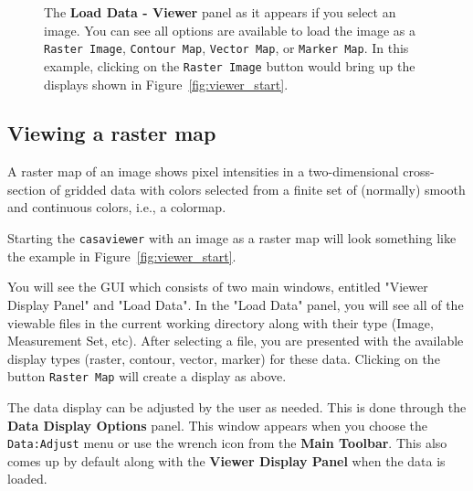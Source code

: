 \begin{figure}[h!]
\begin{center}
\caption{\label{fig:viewer_load_image} The {\bf Load Data - Viewer} panel
as it appears if you select an image.  You can see all options
are available to load the image as a {\tt Raster Image}, 
{\tt Contour Map}, {\tt Vector Map}, or {\tt Marker Map}.
In this example, clicking on the {\tt Raster Image} button would 
bring up the displays shown in Figure~\ref{fig:viewer_start}.}
\hrulefill
\end{center}
\end{figure}


\subsection{Viewing a raster map}
\label{section:display.image.raster}

A raster map of an image shows pixel intensities in a two-dimensional
cross-section of gridded data with colors selected from a finite set
of (normally) smooth and continuous colors, i.e., a colormap.


Starting the {\tt casaviewer} with an image as a raster map will look
something like the example in Figure~\ref{fig:viewer_start}. 
 
You will see the GUI which consists of two main windows, entitled
"Viewer Display Panel" and "Load Data". In the "Load Data" panel, you
will see all of the viewable files in the current working directory along
with their type (Image, Measurement Set, etc).  After selecting a file, you
are presented with the available display types (raster, contour,
vector, marker) for these data. Clicking
on the button {\tt Raster Map} will create a display as above. 

The data display can be adjusted by the user as needed.  This
is done through the {\bf Data Display Options} panel.  This window
appears when you choose the {\tt Data:Adjust} menu or use the
wrench icon from the {\bf Main Toolbar}.  This also comes up
by default along with the {\bf Viewer Display Panel} when the
data is loaded.

